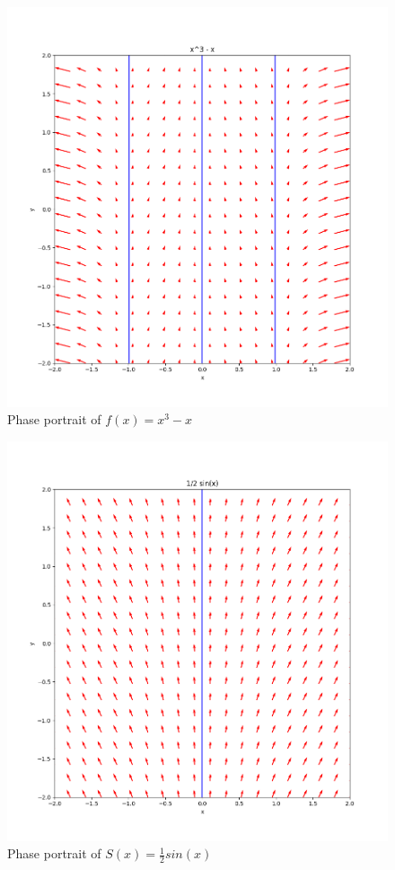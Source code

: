 \documentclass[11pt]{article}
\begin{document}
\begin{figure}[h!]
    \centering
    \includegraphics{phase4.png}
    \caption{Phase portrait of $f(x) = x^3 − x$}
    \label{fig:phase4}
\end{figure}

\begin{figure}[h!]
    \centering
    \includegraphics{phase5.png}
    \caption{Phase portrait of $S(x) = \frac{1}{2}sin(x)$}
    \label{fig:phase5}
\end{figure}
    
\end{document}
